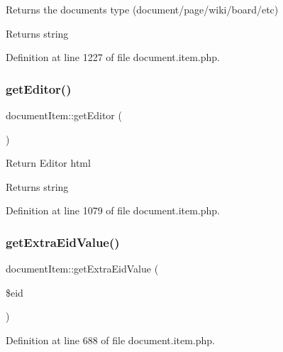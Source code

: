 Returns the document\textquotesingle{}s type (document/page/wiki/board/etc) \begin{DoxyReturn}{Returns}
string 
\end{DoxyReturn}


Definition at line 1227 of file document.\+item.\+php.

\mbox{\label{classdocumentItem_a26477197e85301bc88e35157fdcb7482}} 
\subsubsection{\texorpdfstring{get\+Editor()}{getEditor()}}
{\footnotesize\ttfamily document\+Item\+::get\+Editor (\begin{DoxyParamCaption}{ }\end{DoxyParamCaption})}

Return Editor html \begin{DoxyReturn}{Returns}
string 
\end{DoxyReturn}


Definition at line 1079 of file document.\+item.\+php.

\mbox{\label{classdocumentItem_a9c2574375684cd06a16532744e279c65}} 
\subsubsection{\texorpdfstring{get\+Extra\+Eid\+Value()}{getExtraEidValue()}}
{\footnotesize\ttfamily document\+Item\+::get\+Extra\+Eid\+Value (\begin{DoxyParamCaption}\item[{}]{\$eid }\end{DoxyParamCaption})}



Definition at line 688 of file document.\+item.\+php.

\mbox{\label{classdocumentItem_a52091af79c2df80f8f3c75e37adc2000}} 
